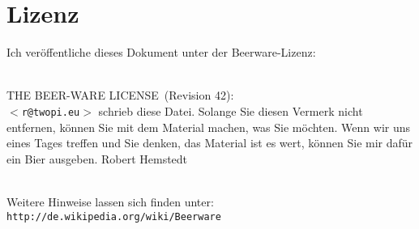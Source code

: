 \documentclass[12pt,a4paper]{article}
\theoremstyle{plain}
\numberwithin{equation}{section}
\newenvironment{fmpage}[1]
{\begin{lrbox}{\fmbox}\begin{minipage}{#1}}
{\end{minipage}\end{lrbox}\fbox{\usebox{\fmbox}}}
\begin{document}
\section*{Lizenz}
Ich veröffentliche dieses Dokument unter der Beerware-Lizenz:\\ \\
\hspace{-3.5cm}
\begin{fmpage}{\textwidth}
\glqq THE BEER-WARE LICENSE\grqq\ (Revision 42):\\
\texttt{$<$r@twopi.eu$>$} schrieb diese Datei. Solange Sie diesen Vermerk nicht entfernen, können Sie mit dem Material machen, was Sie möchten. Wenn wir uns eines Tages treffen und Sie denken, das Material ist es wert, können Sie mir dafür ein Bier ausgeben. Robert Hemstedt
\end{fmpage}
\hspace{3.5cm} \\
Weitere Hinweise lassen sich finden unter: \texttt{http://de.wikipedia.org/wiki/Beerware}
\end{document}
